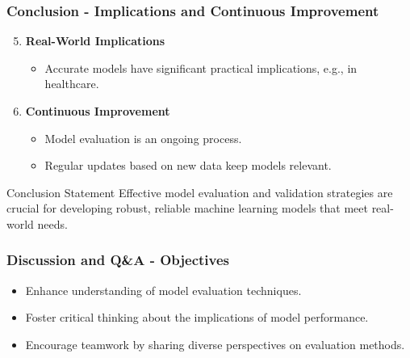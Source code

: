 \documentclass[aspectratio=169]{beamer}
\begin{document}
\begin{frame}[fragile]
    \frametitle{Conclusion - Implications and Continuous Improvement}
    \begin{enumerate}
        \setcounter{enumi}{4} %
        \item \textbf{Real-World Implications}
        \begin{itemize}
            \item Accurate models have significant practical implications, e.g., in healthcare.
        \end{itemize}

        \item \textbf{Continuous Improvement}
        \begin{itemize}
            \item Model evaluation is an ongoing process.
            \item Regular updates based on new data keep models relevant.
        \end{itemize}
    \end{enumerate}

    \begin{block}{Conclusion Statement}
        Effective model evaluation and validation strategies are crucial for developing robust, reliable machine learning models that meet real-world needs.
    \end{block}
\end{frame}

\begin{frame}[fragile]
    \frametitle{Discussion and Q\&A - Objectives}
    \begin{itemize}
        \item Enhance understanding of model evaluation techniques.
        \item Foster critical thinking about the implications of model performance.
        \item Encourage teamwork by sharing diverse perspectives on evaluation methods.
    \end{itemize}
\end{frame}
\end{document}

